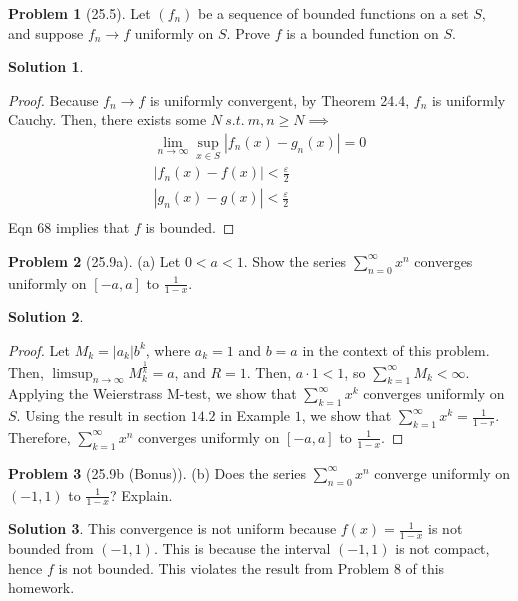 \documentclass[12pt]{article}
\theoremstyle{definition} %
\newtheorem{solution}{Solution}
\newtheorem{problem}{Problem}
\theoremstyle{plain} %
\begin{document}
\begin{problem}[25.5]
    Let $ (f_n) $ be a sequence of bounded functions on a set $ S $, and suppose $ f_n \to f $ uniformly on $ S $. Prove $ f $ is a bounded function on $ S $.
\end{problem}
\begin{solution}
    \begin{proof}
        Because $f_{n}\to f$ is uniformly convergent, by Theorem 24.4, $f_{n}$ is uniformly Cauchy. Then, there exists some $N \ s.t. \ m,n \geq N \implies $ 
    \begin{align}
        \lim_{n \to \infty} \sup_{x\in S} \left\vert f_{n}(x) - g_{n}(x) \right\vert =0\\[10pt]
        \left\vert f_{n}(x)-f(x) \right\vert < \frac{\varepsilon}{2}\\[10pt] 
        \left\vert g_{n}(x)-g(x) \right\vert < \frac{\varepsilon}{2}\\[10pt] 
    \end{align}
    Eqn 68 implies that $f$ is bounded.
    \end{proof}
\end{solution}
\begin{problem}[25.9a]
    (a) Let $ 0 < a < 1 $. Show the series $ \sum_{n=0}^{\infty} x^n $ converges uniformly on $ [-a, a] $ to $ \frac{1}{1 - x} $.
\end{problem}
\begin{solution}
    \begin{proof}
        Let $M_k=\left\vert a_{k} \right\vert b^{k}$, where $a_k = 1$ and $b = a$ in the context of this problem. Then, $\limsup_{n \to \infty} M_k^{\frac{1}{k}}=a$, and $R=1$. Then, $a \cdot 1 < 1$, so $\sum_{k=1}^{\infty} M_k < \infty$. Applying the Weierstrass M-test, we show that $\sum_{k=1}^{\infty} x^{k}$ converges uniformly on $S$. Using the result in section $14.2$ in Example $1$, we show that $\sum_{k=1}^{\infty} x^{k} = \frac{1}{1-r}$. Therefore, $\sum_{k=1}^{\infty} x^{n}$ converges uniformly on $[-a,a]$ to $\frac{1}{1-x}$.       
    \end{proof}
\end{solution}
\begin{problem}[25.9b (Bonus)]
    (b) Does the series $ \sum_{n=0}^{\infty} x^n $ converge uniformly on $ (-1, 1) $ to $ \frac{1}{1 - x} $? Explain.
\end{problem}
\begin{solution}
    This convergence is not uniform because $f(x)=\frac{1}{1-x}$ is not bounded from $(-1,1)$. This is because the interval $(-1,1)$ is not compact, hence $f$ is not bounded. This violates the result from Problem 8 of this homework.
\end{solution}
\end{document}

